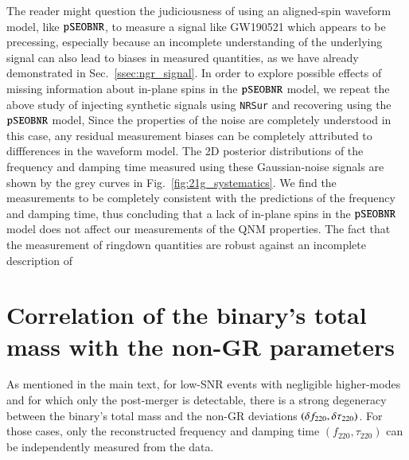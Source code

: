 The reader might question the judiciousness of using an aligned-spin
waveform model, like $\texttt{pSEOBNR}$, to measure a signal like GW190521 which
appears to be precessing, especially because an incomplete
understanding of the underlying signal can also lead to biases in
measured quantities, as we have already demonstrated in
Sec.~\ref{ssec:ngr_signal}. In order to explore possible effects of
missing information about in-plane spins in the $\texttt{pSEOBNR}$ model, we repeat the
above study of injecting synthetic signals using \texttt{NRSur}
and recovering using the $\texttt{pSEOBNR}$ model,  Since the properties
of the noise are completely understood in this case, any residual
measurement biases can be completely attributed to diffferences in the
waveform model. The 2D posterior distributions of the frequency and
damping time measured using these Gaussian-noise signals are shown by
the grey curves in Fig.~\ref{fig:21g_systematics}. We find the
measurements to be completely consistent with the predictions of the
frequency and damping time, thus concluding that a lack of in-plane
spins in the $\texttt{pSEOBNR}$ model does not affect our measurements of the
QNM properties. The fact that the measurement of ringdown quantities
are robust against an incomplete description of  


\section{Correlation of the binary's total mass with the non-GR parameters}\label{sec:correlation}
As mentioned in the main text, for low-SNR events with negligible higher-modes and for which only the post-merger is detectable, there is a strong degeneracy between the binary's total mass and the non-GR deviations $(\delta f_{\text{220}}, \delta \tau_{\text{220}})$. For those cases, only the reconstructed frequency and damping time $(f_{220},\tau _{220})$ can be independently measured from the data. 


